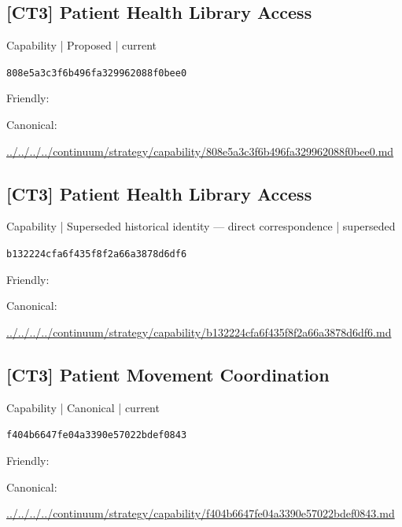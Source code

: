 \documentclass[10pt,a4paper]{article}
\begin{document}
\subsection*{[CT3] Patient Health Library Access}
{\small Capability | Proposed | current}\par
\texttt{808e5a3c3f6b496fa329962088f0bee0}\par
Friendly: \par
Canonical: \par
{\footnotesize\url{../../../../continuum/strategy/capability/808e5a3c3f6b496fa329962088f0bee0.md}}\par
\subsection*{[CT3] Patient Health Library Access}
{\small Capability | Superseded historical identity — direct correspondence | superseded}\par
\texttt{b132224cfa6f435f8f2a66a3878d6df6}\par
Friendly: \par
Canonical: \par
{\footnotesize\url{../../../../continuum/strategy/capability/b132224cfa6f435f8f2a66a3878d6df6.md}}\par
\subsection*{[CT3] Patient Movement Coordination}
{\small Capability | Canonical | current}\par
\texttt{f404b6647fe04a3390e57022bdef0843}\par
Friendly: \par
Canonical: \par
{\footnotesize\url{../../../../continuum/strategy/capability/f404b6647fe04a3390e57022bdef0843.md}}\par
\end{document}
